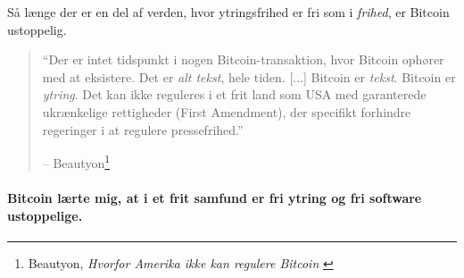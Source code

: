 Så længe der er en del af verden, hvor ytringsfrihed er fri som i 
\textit{frihed}, er Bitcoin ustoppelig.

\begin{quotation}\begin{samepage}
\enquote{Der er intet tidspunkt i nogen Bitcoin-transaktion, hvor Bitcoin
ophører med at eksistere. Det er \textit{alt tekst}, hele tiden.
[...] Bitcoin er \textit{tekst}. Bitcoin er \textit{ytring}. Det kan ikke 
reguleres i et frit land som USA med garanterede ukrænkelige rettigheder (First 
Amendment), der specifikt forhindre regeringer i at regulere pressefrihed.}
\begin{flushright} -- Beautyon\footnote{Beautyon, \textit{Hvorfor Amerika ikke 
    kan regulere Bitcoin} \cite{america-regulate-bitcoin}}
\end{flushright}\end{samepage}\end{quotation}

\paragraph{Bitcoin lærte mig, at i et frit samfund er fri ytring og fri 
software ustoppelige.}

%
%
%
%
%
%
%
